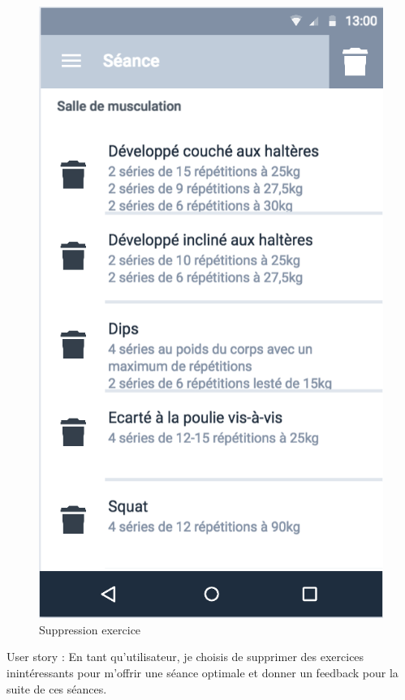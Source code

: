 \begin{figure}[!h]
\centering
\includegraphics[scale=0.3]{ihms/remove_exo}
\caption{Suppression exercice}
\end{figure}

\begin{itshape}
User story : En tant qu'utilisateur, je choisis de supprimer des exercices inintéressants pour m'offrir une séance optimale et donner un feedback pour la suite de ces séances.
\end{itshape}

